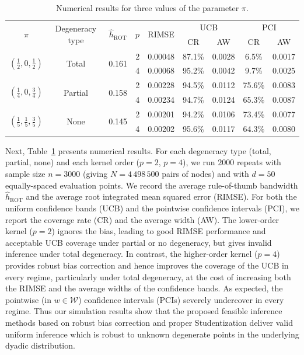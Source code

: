\documentclass[11pt,lof]{puthesis}
\newcommand{\cW}{\ensuremath{\mathcal{W}}}
\DeclareMathOperator{\ROT}{ROT}
\theoremstyle{break}
\theoremstyle{proof}
\begin{document}
\begin{table}[b!]
  \centering
  \begin{tabular}{|c|c|c|c|c|cc|cc|}
    \hline
    \multirow{2}{*}{$ \pi $}
    & \multirow{2}{*}{Degeneracy type}
    & \multirow{2}{*}{$ \hat h_{\ROT} $}
    & \multirow{2}{*}{$ p $}
    & \multirow{2}{*}{RIMSE}
    & \multicolumn{2}{|c|}{UCB}
    & \multicolumn{2}{|c|}{PCI} \\
    \cline{6-9}
    & & & &
    & CR & AW
    & CR & AW \\
    \hline
    \multirow{2}{*}{$ \left(\frac{1}{2}, 0, \frac{1}{2}\right) $}
    & \multirow{2}{*}{Total}
    & \multirow{2}{*}{0.161}
    & 2 & 0.00048 & 87.1\% & 0.0028 & 6.5\% & 0.0017 \\
    & & & 4 & 0.00068 & 95.2\% & 0.0042 & 9.7\% & 0.0025 \\
    \hline
    \multirow{2}{*}{$ \left(\frac{1}{4}, 0, \frac{3}{4}\right) $}
    & \multirow{2}{*}{Partial}
    & \multirow{2}{*}{0.158}
    & 2 & 0.00228 & 94.5\% & 0.0112 & 75.6\% & 0.0083 \\
    & & & 4 & 0.00234 & 94.7\% & 0.0124 & 65.3\% & 0.0087 \\
    \hline
    \multirow{2}{*}{$ \left(\frac{1}{5}, \frac{1}{5}, \frac{3}{5}\right) $}
    & \multirow{2}{*}{None}
    & \multirow{2}{*}{0.145}
    & 2 & 0.00201 & 94.2\% & 0.0106 & 73.4\% & 0.0077 \\
    & & & 4 & 0.00202 & 95.6\% & 0.0117 & 64.3\% & 0.0080 \\
    \hline
  \end{tabular}
  \caption[Numerical results for three values of the parameter $\pi$]{
  Numerical results for three values of the parameter $\pi$.}
  \label{tab:kernel_results}
\end{table}

Next, Table~\ref{tab:kernel_results} presents numerical results. For each
degeneracy type (total, partial, none) and each kernel order ($p=2$, $p=4$), we
run $2000$ repeats with sample size $n=3000$ (giving $N=4\,498\,500$ pairs of
nodes) and with $d=50$ equally-spaced evaluation points. We record the average
rule-of-thumb bandwidth $\hat{h}_{\ROT}$ and the average root integrated mean
squared error (RIMSE). For both the uniform confidence bands (UCB) and the
pointwise confidence intervals (PCI), we report the coverage rate (CR) and the
average width (AW).
%
The lower-order kernel ($p=2$) ignores the bias, leading to good RIMSE
performance and acceptable UCB coverage under partial or no degeneracy, but
gives invalid inference under total degeneracy. In contrast, the higher-order
kernel ($p=4$) provides robust bias correction and hence improves the coverage
of the UCB in every regime, particularly under total degeneracy, at the cost of
increasing both the RIMSE and the average widths of the confidence bands.
%
As expected, the pointwise (in $w\in\cW$) confidence intervals (PCIs) severely
undercover in every regime. Thus our simulation results show that the proposed
feasible inference methods based on robust bias correction and proper
Studentization deliver valid uniform inference which is robust to unknown
degenerate points in the underlying dyadic distribution.
\end{document}
